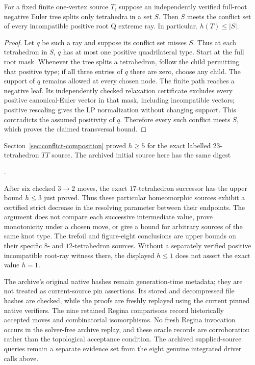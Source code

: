 \begin{proposition}
\label{prop:strict-pachner32-tree-upper-bound}
For a fixed finite one-vertex source $T$, suppose an independently verified full-root
negative Euler tree splits only tetrahedra in a set $S$.  Then $S$
meets the conflict set of every incompatible positive root Q extreme
ray.  In particular, $h(T)\le |S|$.
\end{proposition}
\begin{proof}
Let $q$ be such a ray and suppose its conflict set misses $S$.  Thus at
each tetrahedron in $S$, $q$ has at most one positive quadrilateral type.
Start at the full root mask.  Whenever the tree splits a tetrahedron,
follow the child permitting that positive type; if all three entries
of $q$ there are zero, choose any child.  The support of $q$ remains
allowed at every chosen node.  The finite path reaches a negative leaf.
Its independently checked relaxation certificate excludes every positive
canonical-Euler vector in that mask, including incompatible vectors;
positive rescaling gives the LP normalization without changing support.
This contradicts the assumed positivity of $q$.  Therefore every
such conflict meets $S$, which proves the claimed transversal bound.
\end{proof}

Section~\ref{sec:conflict-composition} proved $h\ge5$ for the exact
labelled $23$-tetrahedron $TT$ source.  The archived initial source here
has the same digest
\begin{center}\scriptsize
{}.
\end{center}
After six checked $3\to2$ moves, the exact $17$-tetrahedron successor
has the upper bound $h\le3$ just proved.  Thus these particular
homeomorphic sources exhibit a certified strict decrease in the resolving
parameter between their endpoints.  The argument does not compare each
successive intermediate value, prove monotonicity under a chosen move,
or give a bound for arbitrary sources of the same knot type.
The trefoil and figure-eight conclusions are upper bounds on their
specific $8$- and $12$-tetrahedron sources.  Without a separately verified
positive incompatible root-ray witness there, the displayed $h\le1$
does not assert the exact value $h=1$.

The archive's original native hashes remain generation-time metadata;
they are not treated as current-source pin assertions.  Its stored and
decompressed file hashes are checked, while the proofs are freshly
replayed using the current pinned native verifiers.  The nine retained
Regina comparisons record historically accepted moves and combinatorial
isomorphisms.  No fresh Regina invocation occurs in the solver-free
archive replay, and these oracle records are corroboration rather than
the topological acceptance condition.  The archived supplied-source
queries remain a separate evidence set from the eight genuine integrated
driver calls above.

